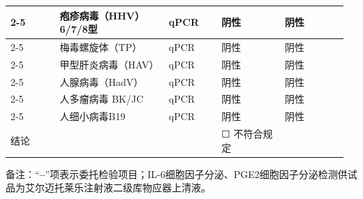 \documentclass[UTF8,10pt,a4paper,fontset=fandol]{ctexart}
\newcommand{\fieldvalue}[1]{#1}
\newcommand{\checkboxfield}[1]{\ifstrequal{#1}{checked}{☑}{\ifstrequal{#1}{unclear}{?}{☐}}}
\begin{document}
\begin{tabular}{|p{0.14\linewidth}|p{0.31\linewidth}|p{0.15\linewidth}|p{0.18\linewidth}|p{0.18\linewidth}|}
\\ \cline{2-5}
& %
\fieldvalue{疱疹病毒（HHV）6/7/8型}
& %
\fieldvalue{qPCR}
& %
\fieldvalue{阴性}
& %
\fieldvalue{阴性}
\\ \cline{2-5}
& %
\fieldvalue{梅毒螺旋体（TP）}
& %
\fieldvalue{qPCR}
& %
\fieldvalue{阴性}
& %
\fieldvalue{阴性}
\\ \cline{2-5}
& %
\fieldvalue{甲型肝炎病毒（HAV）}
& %
\fieldvalue{qPCR}
& %
\fieldvalue{阴性}
& %
\fieldvalue{阴性}
\\ \cline{2-5}
& %
\fieldvalue{人腺病毒（HadV）}
& %
\fieldvalue{qPCR}
& %
\fieldvalue{阴性}
& %
\fieldvalue{阴性}
\\ \cline{2-5}
& %
\fieldvalue{人多瘤病毒 BK/JC}
& %
\fieldvalue{qPCR}
& %
\fieldvalue{阴性}
& %
\fieldvalue{阴性}
\\ \cline{2-5}
& %
\fieldvalue{人细小病毒B19}
& %
\fieldvalue{qPCR}
& %
\fieldvalue{阴性}
& %
\fieldvalue{阴性}
\\ \hline
结论 &
&
&
\fieldvalue{\checkboxfield{unchecked}} 不符合规定
&
\\ \hline
\end{tabular}

\noindent
备注：“\textbf{--}”项表示委托检验项目；IL-6细胞因子分泌、PGE2细胞因子分泌检测供试品为艾尔迈托莱乐注射液二级库物应器上清液。
\end{document}
